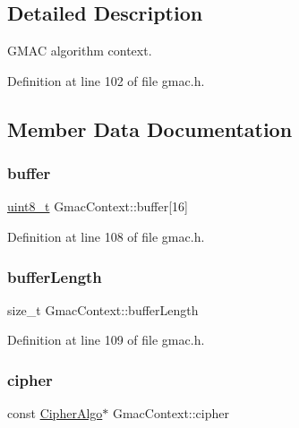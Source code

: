 \subsection{Detailed Description}
G\+M\+AC algorithm context. 

Definition at line 102 of file gmac.\+h.



\subsection{Member Data Documentation}
\mbox{\label{structGmacContext_ac0106d4b7496e620f9d6f354345bac2c}} 
\subsubsection{\texorpdfstring{buffer}{buffer}}
{\footnotesize\ttfamily \hyperlink{stdint_8h_aba7bc1797add20fe3efdf37ced1182c5}{uint8\+\_\+t} Gmac\+Context\+::buffer\mbox{[}16\mbox{]}}



Definition at line 108 of file gmac.\+h.

\mbox{\label{structGmacContext_a751b0d43545dad89b8714d3584514ede}} 
\subsubsection{\texorpdfstring{buffer\+Length}{bufferLength}}
{\footnotesize\ttfamily size\+\_\+t Gmac\+Context\+::buffer\+Length}



Definition at line 109 of file gmac.\+h.

\mbox{\label{structGmacContext_a1fd83571a16fb7cf5ab884599319839e}} 
\subsubsection{\texorpdfstring{cipher}{cipher}}
{\footnotesize\ttfamily const \hyperlink{structCipherAlgo}{Cipher\+Algo}$\ast$ Gmac\+Context\+::cipher}



